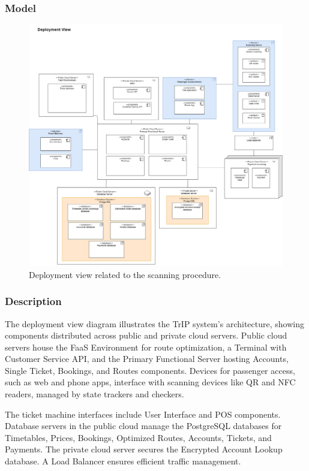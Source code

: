 \subsubsection{Model}
\begin{figure}[H]
    \centering
    \includegraphics[width=\textwidth]{drawings/views_final_version/deployment_view.png}
    \caption{Deployment view related to the scanning procedure.}
    \label{fig:deployment_view_scanning}
\end{figure}

\subsubsection{Description}
The deployment view diagram illustrates the TrIP system's architecture, showing components distributed across public and private cloud servers. Public cloud servers house the FaaS Environment for route optimization, a Terminal with Customer Service API, and the Primary Functional Server hosting Accounts, Single Ticket, Bookings, and Routes components. Devices for passenger access, such as web and phone apps, interface with scanning devices like QR and NFC readers, managed by state trackers and checkers.

The ticket machine interfaces include User Interface and POS components. Database servers in the public cloud manage the PostgreSQL databases for Timetables, Prices, Bookings, Optimized Routes, Accounts, Tickets, and Payments. The private cloud server secures the Encrypted Account Lookup database. A Load Balancer ensures efficient traffic management.

